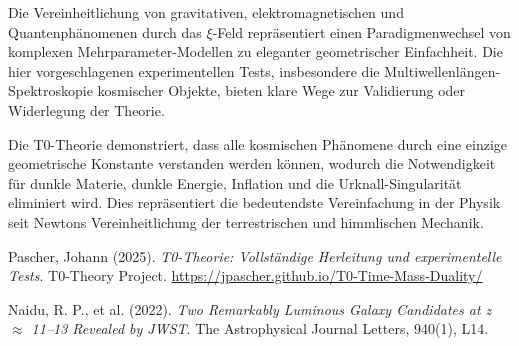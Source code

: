\documentclass[12pt,a4paper]{article}
\theoremstyle{definition}
\begin{document}
	Die Vereinheitlichung von gravitativen, elektromagnetischen und Quantenph\"anomenen durch das $\xi$-Feld repr\"asentiert einen Paradigmenwechsel von komplexen Mehrparameter-Modellen zu eleganter geometrischer Einfachheit. Die hier vorgeschlagenen experimentellen Tests, insbesondere die Multiwellenl\"angen-Spektroskopie kosmischer Objekte, bieten klare Wege zur Validierung oder Widerlegung der Theorie.
	
	\begin{important}[title=Abschlie\ss{}ende Perspektive]
		Die T0-Theorie demonstriert, dass alle kosmischen Ph\"anomene durch eine einzige geometrische Konstante verstanden werden k\"onnen, wodurch die Notwendigkeit f\"ur dunkle Materie, dunkle Energie, Inflation und die Urknall-Singularit\"at eliminiert wird. Dies repr\"asentiert die bedeutendste Vereinfachung in der Physik seit Newtons Vereinheitlichung der terrestrischen und himmlischen Mechanik.
	\end{important}
	
	
	\begin{thebibliography}{99}
		
		Pascher, Johann (2025). 
		\textit{T0-Theorie: Vollst\"andige Herleitung und experimentelle Tests}. 
		T0-Theory Project. 
		\url{https://jpascher.github.io/T0-Time-Mass-Duality/}
		
		Naidu, R. P., et al. (2022). 
		\textit{Two Remarkably Luminous Galaxy Candidates at z $\approx$ 11--13 Revealed by JWST}. 
		The Astrophysical Journal Letters, 940(1), L14.
		
	\end{thebibliography}
	
\end{document}
